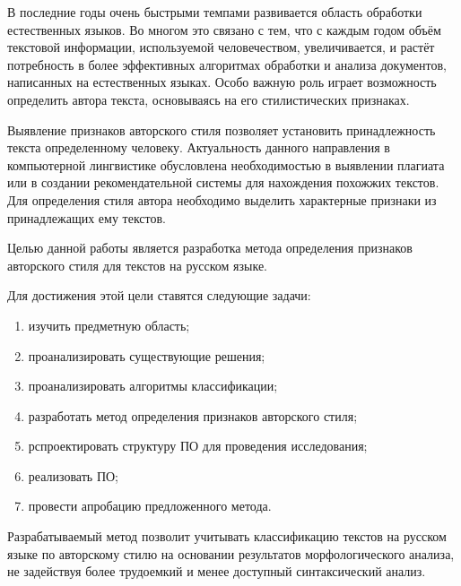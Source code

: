 \Introduction
В последние годы очень быстрыми темпами развивается область  обработки естественных языков. Во  многом  это связано с тем, что с каждым годом объём текстовой информации, используемой человечеством,  увеличивается,  и  растёт  потребность  в  более  эффективных алгоритмах  обработки  и  анализа  документов,  написанных  на  естественных языках. Особо важную роль играет возможность определить автора текста, основываясь на его стилистических признаках.

Выявление признаков авторского стиля позволяет установить принадлежность текста определенному человеку. Актуальность данного направления в компьютерной лингвистике обусловлена необходимостью в выявлении плагиата или в создании рекомендательной системы для нахождения похожжих текстов. Для определения стиля автора необходимо выделить характерные признаки из принадлежащих ему текстов.


Целью данной работы является разработка метода определения признаков авторского стиля для текстов на русском языке.

Для достижения этой цели ставятся следующие задачи:

\begin{enumerate}
	\item изучить предметную область;
    \item проанализировать существующие решения;
    \item проанализировать алгоритмы классификации;
    \item разработать метод определения признаков авторского стиля;
    \item рспроектировать структуру ПО для проведения исследования;
    \item реализовать ПО;
    \item провести апробацию предложенного метода.
\end{enumerate}

Разрабатываемый метод позволит учитывать классификацию текстов на русском языке по авторскому стилю на основании результатов морфологического анализа, не задействуя более трудоемкий и менее доступный синтаксический анализ.
